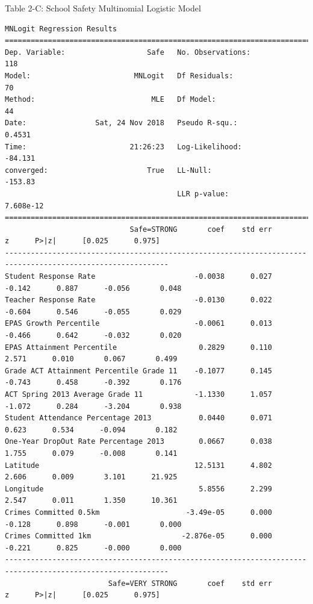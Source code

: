 \documentclass[11pt]{article}
\newcommand{\1}{\mathds{1}}
\begin{document}
\newpage
\noindent 
Table 2-C: School Safety Multinomial Logistic Model
\begin{Verbatim}[fontsize=\tiny]
MNLogit Regression Results                          
==============================================================================
Dep. Variable:                   Safe   No. Observations:                  118
Model:                        MNLogit   Df Residuals:                       70
Method:                           MLE   Df Model:                           44
Date:                Sat, 24 Nov 2018   Pseudo R-squ.:                  0.4531
Time:                        21:26:23   Log-Likelihood:                -84.131
converged:                       True   LL-Null:                       -153.83
                                        LLR p-value:                 7.608e-12
============================================================================================================
                             Safe=STRONG       coef    std err          z      P>|z|      [0.025      0.975]
------------------------------------------------------------------------------------------------------------
Student Response Rate                       -0.0038      0.027     -0.142      0.887      -0.056       0.048
Teacher Response Rate                       -0.0130      0.022     -0.604      0.546      -0.055       0.029
EPAS Growth Percentile                      -0.0061      0.013     -0.466      0.642      -0.032       0.020
EPAS Attainment Percentile                   0.2829      0.110      2.571      0.010       0.067       0.499
Grade ACT Attainment Percentile Grade 11    -0.1077      0.145     -0.743      0.458      -0.392       0.176
ACT Spring 2013 Average Grade 11            -1.1330      1.057     -1.072      0.284      -3.204       0.938
Student Attendance Percentage 2013           0.0440      0.071      0.623      0.534      -0.094       0.182
One-Year DropOut Rate Percentage 2013        0.0667      0.038      1.755      0.079      -0.008       0.141
Latitude                                    12.5131      4.802      2.606      0.009       3.101      21.925
Longitude                                    5.8556      2.299      2.547      0.011       1.350      10.361
Crimes Committed 0.5km                    -3.49e-05      0.000     -0.128      0.898      -0.001       0.000
Crimes Committed 1km                     -2.876e-05      0.000     -0.221      0.825      -0.000       0.000
------------------------------------------------------------------------------------------------------------
                        Safe=VERY STRONG       coef    std err          z      P>|z|      [0.025      0.975]

\end{Verbatim}
\end{document}
